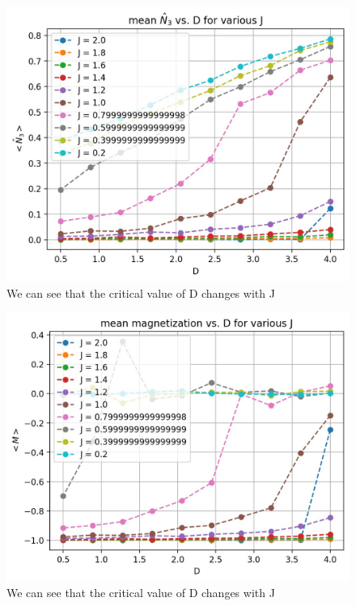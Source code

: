 \documentclass[12pt, a4paper]{article}
\begin{document}
	\begin{figure}[h!]
	\centering
	\includegraphics[width=.8\linewidth]{../p1/results/mean_n3_10.jpg}
	\caption{We can see that the critical value of D changes with J}
	\label{fig:n3_10}
\end{figure}

	\begin{figure}[h!]
	\centering
	\includegraphics[width=.8\linewidth]{../p1/results/magnetization_10.jpg}
	\caption{We can see that the critical value of D changes with J}
	\label{fig:mag_10}
\end{figure}
	
\end{document}
